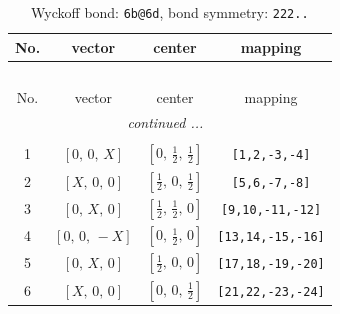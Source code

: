 \documentclass[fleqn,8pt]{jsarticle}
\begin{document}
\renewcommand{\arraystretch}{1.2}
\begin{longtable}{cccc}
\caption{Wyckoff bond: {\tt 6b@6d}, bond symmetry: {\tt 222..}}
 \\
 \hline \hline
No. & vector & center & mapping \\ \hline \endfirsthead

\multicolumn{3}{l}{\tablename\ \thetable{}} \\
 \hline \hline
No. & vector & center & mapping \\ \hline \endhead

 \hline \hline
\multicolumn{3}{r}{\footnotesize\it continued ...} \\ \endfoot

 \hline \hline
\multicolumn{3}{r}{} \\ \endlastfoot

1 & $\left[ 0,\, 0,\, X \right]$ & $\left[ 0,\, \frac{1}{2},\, \frac{1}{2} \right]$ & {\tt [1,2,-3,-4]} \\ \hline
2 & $\left[ X,\, 0,\, 0 \right]$ & $\left[ \frac{1}{2},\, 0,\, \frac{1}{2} \right]$ & {\tt [5,6,-7,-8]} \\ \hline
3 & $\left[ 0,\, X,\, 0 \right]$ & $\left[ \frac{1}{2},\, \frac{1}{2},\, 0 \right]$ & {\tt [9,10,-11,-12]} \\ \hline
4 & $\left[ 0,\, 0,\, - X \right]$ & $\left[ 0,\, \frac{1}{2},\, 0 \right]$ & {\tt [13,14,-15,-16]} \\ \hline
5 & $\left[ 0,\, X,\, 0 \right]$ & $\left[ \frac{1}{2},\, 0,\, 0 \right]$ & {\tt [17,18,-19,-20]} \\ \hline
6 & $\left[ X,\, 0,\, 0 \right]$ & $\left[ 0,\, 0,\, \frac{1}{2} \right]$ & {\tt [21,22,-23,-24]} \\
\end{longtable}
\renewcommand{\arraystretch}{1.2}
\end{document}
